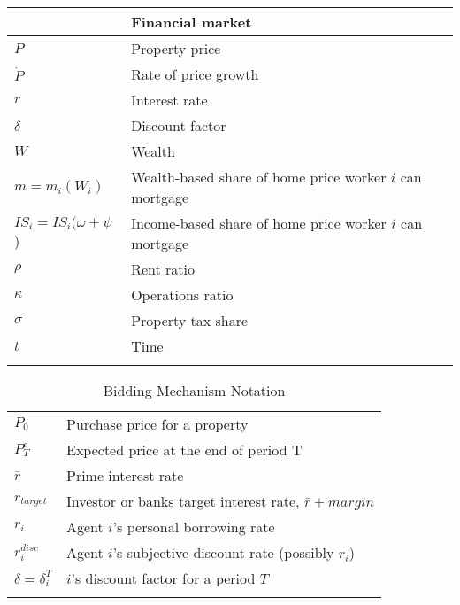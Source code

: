 \begin{longtable}{lp{10cm}}
\hline           & \textbf{Financial market}    \\ \hline
$P$              &  Property price              \\ %
$\dot P$         &  Rate of price growth        \\
$r$              &  Interest rate               \\
$\delta$         &  Discount factor             \\
$W$              &  Wealth                      \\
$m = m_i(W_i)$   &  Wealth-based share of home price worker $i$ can mortgage           \\
$IS_i = IS_i(\omega+\psi$)  &  Income-based share of home price worker $i$ can mortgage \\
$\rho$           &  Rent ratio             \\
$\kappa$         &  Operations ratio       \\
$\sigma$         &  Property tax share     \\ %
$t$              &  Time                   \\
\hline
\color{black}
\end{longtable}  



\newpage
\begin{longtable}{lp{10cm}}
\caption{Bidding Mechanism Notation}                       \\
\hline
$P_0$            &  Purchase price for a property          \\
$P^e_T$          &  Expected price at the end of period T  \\
$\bar r$         &  Prime interest rate                    \\
$r_{target}$     &  Investor or banks target interest rate, $\bar r + margin$ \\
$r_i$            &  Agent $i$'s personal borrowing rate    \\
$r_i^{disc}$     &  Agent $i$'s subjective discount rate (possibly $r_i$)     \\
$\delta = \delta_i^T$ &  $i$'s discount factor for a period $T$               \\
\hline
\color{black}
\end{longtable}  

